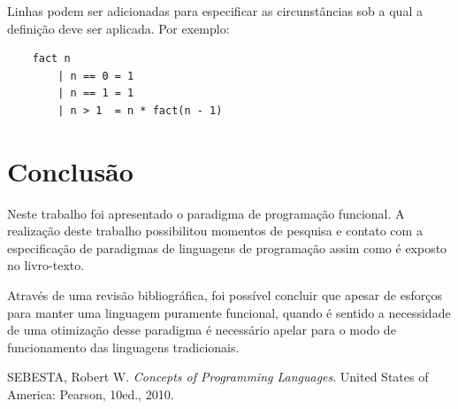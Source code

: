 \documentclass[a4paper, twoside, 12pt]{article}
\begin{document}
Linhas podem ser adicionadas para especificar as circunstâncias sob a qual a definição deve ser aplicada. Por exemplo:

\begin{verbatim}
    fact n
        | n == 0 = 1
        | n == 1 = 1
        | n > 1  = n * fact(n - 1)
\end{verbatim}

\clearpage
\section{Conclusão \label{sec:conclusao}}

Neste trabalho foi apresentado o paradigma de programação funcional. A realização deste trabalho possibilitou momentos de pesquisa e contato com a especificação de paradigmas de linguagens de programação assim como é exposto no livro-texto.

Através de uma revisão bibliográfica, foi possível concluir que apesar de esforços para manter uma linguagem puramente funcional, quando é sentido a necessidade de uma otimização desse paradigma é necessário apelar para o modo de funcionamento das linguagens tradicionais.


\clearpage %

\begin{thebibliography}{9}

		SEBESTA, Robert W. \textit{Concepts of Programming Languages}. United States of America: Pearson, 10ed., 2010.

\end{thebibliography}

\end{document}
